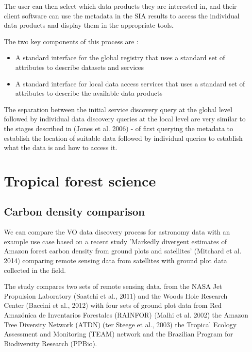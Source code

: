 \documentclass{article}
\begin{document}
The user can then select which data products they are interested in, and their
client software can use the metadata in the SIA results to access the individual
data products and display them in the appropriate tools.

\noindent
The two key components of this process are :
\begin{itemize}
  \item A standard interface for the global registry that uses a standard set of
  attributes to describe datasets and services
  \item A standard interface for local data access services that uses a standard
  set of attributes to describe the available data products
\end{itemize}

The separation between the initial service discovery query at the global
level followed by individual data discovery queries at the local level
are very similar to the stages described in (Jones et al. 2006) - of first
querying the metadata to establish the location of suitable data followed
by individual queries to establish what the data is and how to access it.

\section{Tropical forest science}

\subsection{Carbon density comparison}

We can compare the VO data discovery process for astronomy data with an example
use case based on a recent study 'Markedly divergent estimates of Amazon forest
carbon density from ground plots and satellites' (Mitchard et al. 2014)
comparing remote sensing data from satellites with ground plot data collected
in the field.

The study compares two sets of remote sensing data, from
the NASA Jet Propulsion Laboratory
(Saatchi et al., 2011)
and the Woods Hole Research Center
(Baccini et al., 2012)
with four sets of ground plot data from
Red Amazónica de Inventarios Forestales (RAINFOR) (Malhi et al. 2002)
the Amazon Tree Diversity Network (ATDN) (ter Steege et al., 2003)
the Tropical Ecology Assessment and Monitoring (TEAM)
network and the
Brazilian Program for Biodiversity Research
(PPBio).
\end{document}
